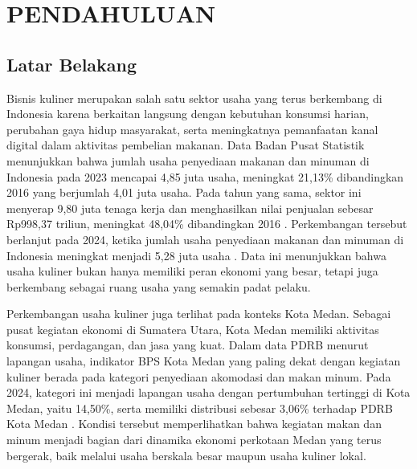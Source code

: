 \chapter{PENDAHULUAN}

\section{Latar Belakang}
Bisnis kuliner merupakan salah satu sektor usaha yang terus berkembang di Indonesia karena berkaitan langsung dengan kebutuhan konsumsi harian, perubahan gaya hidup masyarakat, serta meningkatnya pemanfaatan kanal digital dalam aktivitas pembelian makanan. Data Badan Pusat Statistik menunjukkan bahwa jumlah usaha penyediaan makanan dan minuman di Indonesia pada 2023 mencapai 4,85 juta usaha, meningkat 21,13\% dibandingkan 2016 yang berjumlah 4,01 juta usaha. Pada tahun yang sama, sektor ini menyerap 9,80 juta tenaga kerja dan menghasilkan nilai penjualan sebesar Rp998,37 triliun, meningkat 48,04\% dibandingkan 2016 \parencite{bps2024pmm}. Perkembangan tersebut berlanjut pada 2024, ketika jumlah usaha penyediaan makanan dan minuman di Indonesia meningkat menjadi 5,28 juta usaha \parencite{bps2025pmm}. Data ini menunjukkan bahwa usaha kuliner bukan hanya memiliki peran ekonomi yang besar, tetapi juga berkembang sebagai ruang usaha yang semakin padat pelaku.

Perkembangan usaha kuliner juga terlihat pada konteks Kota Medan. Sebagai pusat kegiatan ekonomi di Sumatera Utara, Kota Medan memiliki aktivitas konsumsi, perdagangan, dan jasa yang kuat. Dalam data PDRB menurut lapangan usaha, indikator BPS Kota Medan yang paling dekat dengan kegiatan kuliner berada pada kategori penyediaan akomodasi dan makan minum. Pada 2024, kategori ini menjadi lapangan usaha dengan pertumbuhan tertinggi di Kota Medan, yaitu 14,50\%, serta memiliki distribusi sebesar 3,06\% terhadap PDRB Kota Medan \parencite{bpsmedan2025ekonomi}. Kondisi tersebut memperlihatkan bahwa kegiatan makan dan minum menjadi bagian dari dinamika ekonomi perkotaan Medan yang terus bergerak, baik melalui usaha berskala besar maupun usaha kuliner lokal.

